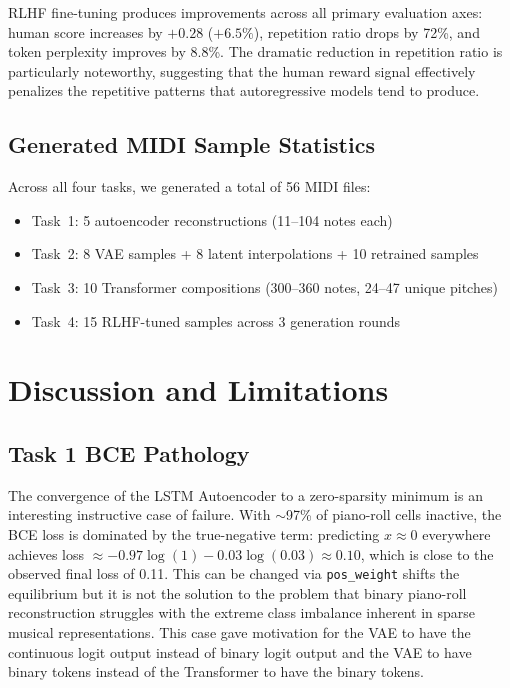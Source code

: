 \documentclass[conference]{IEEEtran}
\begin{document}
RLHF fine-tuning produces improvements across all primary evaluation axes: human score increases by $+0.28$ ($+6.5\%$), repetition ratio drops by 72\%, and token perplexity improves by 8.8\%. The dramatic reduction in repetition ratio is particularly noteworthy, suggesting that the human reward signal effectively penalizes the repetitive patterns that autoregressive models tend to produce.

\subsection{Generated MIDI Sample Statistics}

Across all four tasks, we generated a total of 56 MIDI files:
\begin{itemize}
    \item Task~1: 5 autoencoder reconstructions (11--104 notes each)
    \item Task~2: 8 VAE samples + 8 latent interpolations + 10 retrained samples
    \item Task~3: 10 Transformer compositions (300--360 notes, 24--47 unique pitches)
    \item Task~4: 15 RLHF-tuned samples across 3 generation rounds
\end{itemize}

\section{Discussion and Limitations}

\subsection{Task 1 BCE Pathology}

The convergence of the LSTM Autoencoder to a zero-sparsity minimum is an interesting instructive case of failure. With $\sim$97\% of piano-roll cells inactive, the BCE loss is dominated by the true-negative term: predicting $\hat{x} \approx 0$ everywhere achieves loss $\approx -0.97\log(1) - 0.03\log(0.03) \approx 0.10$, which is close to the observed final loss of 0.11. This can be changed via \texttt{pos\_weight} shifts the equilibrium but it is not the solution to the problem that binary piano-roll reconstruction struggles with the extreme class imbalance inherent in sparse musical representations. This case gave
motivation for the VAE to have the continuous logit output instead of binary logit output and the VAE to have binary tokens instead of the Transformer to have the binary tokens.
\end{document}
